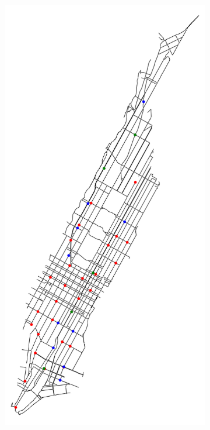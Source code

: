 \begin{figure}[tbh]
\begin{subfigure}[b]{0.32\textwidth}
		\caption{}
		\label{fig:nyc_rn_info}
	\end{subfigure}
	\begin{subfigure}[b]{0.32\textwidth}
		\centering
		\includegraphics[width=\textwidth]{assets/img/07_graph_based/new_york_simplified_info.png}

\end{subfigure}
\end{figure}

